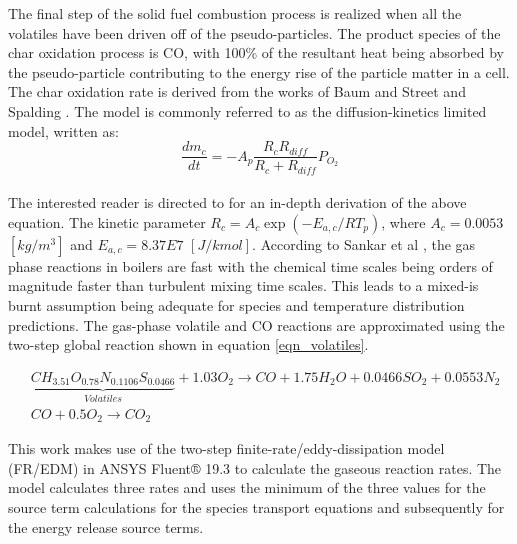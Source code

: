 \documentclass{webofc}
\begin{document}
The final step of the solid fuel combustion process is realized when all the volatiles have been driven off of the pseudo-particles. The product species of the char oxidation process is CO, with 100\% of the resultant heat being absorbed by the pseudo-particle contributing to the energy rise of the particle matter in a cell. The char oxidation rate is derived from the works of Baum and Street \cite{baum} and Spalding \cite{spalding}. The model is commonly referred to as the diffusion-kinetics limited model, written as:
\begin{equation}\label{eqn_char_release}
\frac{dm_c}{dt}=-A_{p}\frac{R_{c}R_{diff}}{R_{c}+R_{diff}}P_{O_{2}}
\end{equation}
\\
The interested reader is directed to \cite{ansys} for an in-depth derivation of the above equation. The kinetic parameter $R_{c} = A_{c} \exp(-E_{a,c} / R T_p)$, where $A_c = 0.0053$ $[kg/m^3]$ and $E_{a,c} = 8.37E7$ $[J/kmol]$. According to Sankar et al \cite{sankar}, the gas phase reactions in boilers are fast with the chemical time scales being orders of magnitude faster than turbulent mixing time scales. This leads to a mixed-is burnt assumption being adequate for species and temperature distribution predictions. The gas-phase volatile and CO reactions are approximated using the two-step global reaction shown in equation \ref{eqn_volatiles}. 

\begin{equation}\label{eqn_volatiles}
\begin{split}
&\underbrace{CH_{3.51}O_{0.78}N_{0.1106}S_{0.0466}}_{Volatiles}+1.03O_2\to CO + 1.75H_2O + 0.0466SO_{2} + 0.0553N_2\\
&CO + 0.5O_2\to CO_2
\end{split}
\end{equation}

This work makes use of the two-step finite-rate/eddy-dissipation model (FR/EDM) in ANSYS Fluent® 19.3 \cite{ansys} to calculate the gaseous reaction rates. The model calculates three rates and uses the minimum of the three values for the source term calculations for the species transport equations and subsequently for the energy release source terms.\\
\end{document}
